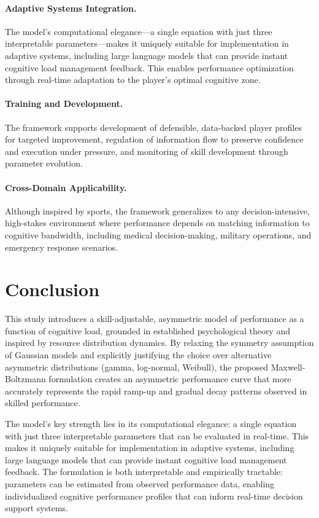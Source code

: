 \documentclass{article}
\begin{document}
\paragraph{Adaptive Systems Integration.} The model's computational elegance—a single equation with just three 
interpretable parameters—makes it uniquely suitable for implementation in adaptive systems, including large language 
models that can provide instant cognitive load management feedback. This enables performance optimization through 
real-time adaptation to the player's optimal cognitive zone.

\paragraph{Training and Development.} The framework supports development of defensible, data-backed player profiles 
for targeted improvement, regulation of information flow to preserve confidence and execution under pressure, and 
monitoring of skill development through parameter evolution.

\paragraph{Cross-Domain Applicability.} Although inspired by sports, the framework generalizes to any 
decision-intensive, high-stakes environment where performance depends on matching information to cognitive bandwidth, 
including medical decision-making, military operations, and emergency response scenarios.

\section*{Conclusion}

This study introduces a skill-adjustable, asymmetric model of performance as a function of cognitive load, grounded in
established psychological theory and inspired by resource distribution dynamics. By relaxing the symmetry assumption of
Gaussian models and explicitly justifying the choice over alternative asymmetric distributions (gamma, log-normal, 
Weibull), the proposed Maxwell-Boltzmann formulation creates an asymmetric performance curve that more accurately 
represents the rapid ramp-up and gradual decay patterns observed in skilled performance.

The model's key strength lies in its computational elegance: a single equation with just three interpretable parameters 
that can be evaluated in real-time. This makes it uniquely suitable for implementation in adaptive systems, including 
large language models that can provide instant cognitive load management feedback. The formulation is both interpretable 
and empirically tractable: parameters can be estimated from observed performance data, enabling individualized cognitive 
performance profiles that can inform real-time decision support systems.
\end{document}
